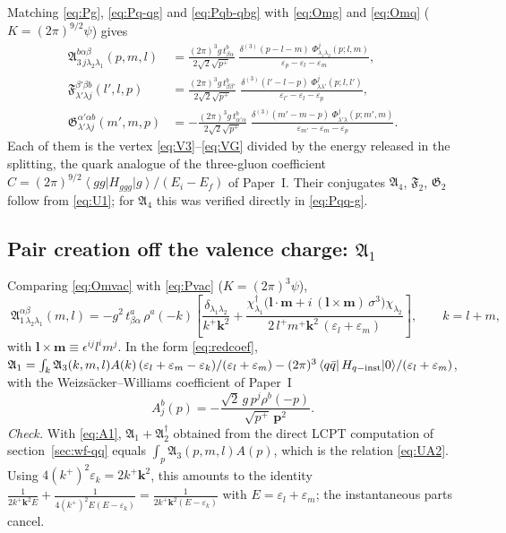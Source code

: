 \documentclass[11pt,a4paper]{article}
\numberwithin{equation}{section}
\newcommand{\mf}[1]{\mathfrak{#1}}
\newcommand{\eps}{\varepsilon}
\newcommand{\dg}{\dagger}
\newcommand{\dthree}{\delta^{(3)}}
\newcommand{\ket}[1]{\left|#1\right\rangle}
\newcommand{\bra}[1]{\left\langle#1\right|}
\newcommand{\vac}{|0\rangle}
\newcommand{\Ph}{\Phi}
\begin{document}
Matching \eqref{eq:Pg}, \eqref{eq:Pq-qg} and \eqref{eq:Pqb-qbg} with \eqref{eq:Omg} and \eqref{eq:Omq}
($K=(2\pi)^{9/2}\psi$) gives
\begin{align}
\mf A^{b\alpha\beta}_{3\,j\lambda_{2}\lambda_{1}}(p,m,l)&=
\frac{(2\pi)^{3}g\,t^{b}_{\beta\alpha}}{2\sqrt2\sqrt{p^{+}}}\;
\frac{\dthree(p-l-m)\;\Ph^{j}_{\lambda_{1}\lambda_{2}}(p;l,m)}{\eps_{p}-\eps_{l}-\eps_{m}},
\label{eq:A3}\\
\mf F^{\beta'\beta b}_{\lambda'\lambda j}(l',l,p)&=
\frac{(2\pi)^{3}g\,t^{b}_{\beta\beta'}}{2\sqrt2\sqrt{p^{+}}}\;
\frac{\dthree(l'-l-p)\;\Ph^{j}_{\lambda\lambda'}(p;l,l')}{\eps_{l'}-\eps_{l}-\eps_{p}},
\label{eq:F}\\
\mf G^{\alpha'\alpha b}_{\lambda'\lambda j}(m',m,p)&=
-\frac{(2\pi)^{3}g\,t^{b}_{\alpha'\alpha}}{2\sqrt2\sqrt{p^{+}}}\;
\frac{\dthree(m'-m-p)\;\Ph^{j}_{\lambda'\lambda}(p;m',m)}{\eps_{m'}-\eps_{m}-\eps_{p}} .
\label{eq:G}
\end{align}
Each of them is the vertex \eqref{eq:V3}--\eqref{eq:VG} divided by the energy released in the
splitting, the quark analogue of the three-gluon coefficient
$C=(2\pi)^{9/2}\bra{gg}H_{ggg}\ket{g}/(E_{i}-E_{f})$ of Paper~I. Their conjugates
$\mf A_{4}$, $\mf F_{2}$, $\mf G_{2}$ follow from \eqref{eq:U1}; for $\mf A_{4}$ this was verified directly
in \eqref{eq:Pqq-g}.

\subsection{Pair creation off the valence charge: $\mf A_{1}$}

Comparing \eqref{eq:Omvac} with \eqref{eq:Pvac} ($K=(2\pi)^{3}\psi$),
\begin{equation}
\boxed{\;
\mf A^{\alpha\beta}_{1\,\lambda_{2}\lambda_{1}}(m,l)=
-g^{2}\,t^{a}_{\beta\alpha}\,\rho^{a}(-k)\left[
\frac{\delta_{\lambda_{1}\lambda_{2}}}{k^{+}\bm k^{2}}
+\frac{\chi^{\dg}_{\lambda_{1}}\big(\bm l\!\cdot\!\bm m+i\,(\bm l\!\times\!\bm m)\,\sigma^{3}\big)\chi_{\lambda_{2}}}
{2\,l^{+}m^{+}\bm k^{2}\,(\eps_{l}+\eps_{m})}\right],\qquad k=l+m,\;}
\label{eq:A1}
\end{equation}
with $\bm l\!\times\!\bm m\equiv\epsilon^{ij}l^{i}m^{j}$. In the form \eqref{eq:redcoef},
$\mf A_{1}=\int_{k}\mf A_{3}(k,m,l)A(k)\,(\eps_{l}+\eps_{m}-\eps_{k})/(\eps_{l}+\eps_{m})
-(2\pi)^{3}\bra{q\bar q}H_{q-{\rm inst}}\vac/(\eps_{l}+\eps_{m})$, with the
Weizs\"acker--Williams coefficient of Paper~I
\begin{equation}
A^{b}_{j}(p)=-\frac{\sqrt2\,g\,p^{j}\rho^{b}(-p)}{\sqrt{p^{+}}\,\bm p^{2}} .
\label{eq:Acoef}
\end{equation}
\emph{Check.} With \eqref{eq:A1}, $\mf A_{1}+\mf A_{2}^{\dg}$ obtained from the direct LCPT
computation of section~\ref{sec:wf-qq} equals $\int_{p}\mf A_{3}(p,m,l)A(p)$, which is the
relation \eqref{eq:UA2}. Using $4(k^{+})^{2}\eps_{k}=2k^{+}\bm k^{2}$, this amounts to the identity
$\frac{1}{2k^{+}\bm k^{2}E}+\frac{1}{4(k^{+})^{2}E(E-\eps_{k})}=\frac{1}{2k^{+}\bm k^{2}(E-\eps_{k})}$
with $E=\eps_{l}+\eps_{m}$; the instantaneous parts cancel.
\end{document}
